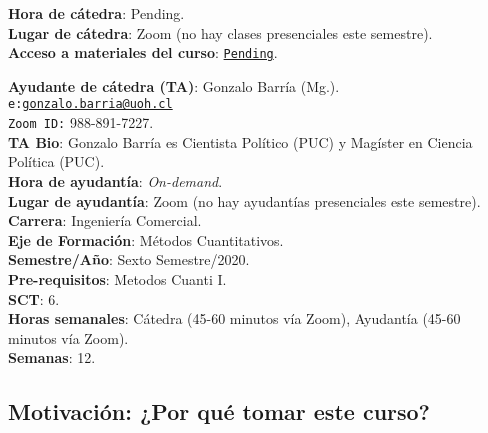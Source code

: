 \documentclass[letterpaper]{article}
\begin{document}
\vspace{5mm}
{\bf Hora de c\'atedra}: {\color{red}Pending.}\\
{\bf Lugar de c\'atedra}: Zoom (no hay clases presenciales este semestre).\\

{\bf Acceso a materiales del curso}: \href{https://ucampus.uoh.cl/uoh/2020/1/ICE3201/1}{\texttt{{\color{red}Pending}}}.

\vspace{5mm}
{\bf Ayudante de c\'atedra (TA)}: Gonzalo Barr\'ia (Mg.).\\
\texttt{e:}\href{mailto:gonzalo.barria@uoh.cl}{\texttt{gonzalo.barria@uoh.cl}}\\
\texttt{Zoom ID:} 988-891-7227.\\
{\bf TA Bio}: Gonzalo Barr\'ia es Cientista Pol\'itico (PUC) y Mag\'ister en Ciencia Pol\'itica (PUC).\\
{\bf Hora de ayudant\'ia}: \emph{On-demand}.\\
{\bf Lugar de ayudant\'ia}: Zoom (no hay ayudant\'ias presenciales este semestre).\\


\vspace{5mm}
{\bf Carrera}:  Ingenier\'ia Comercial.\\
{\bf Eje de Formaci\'on}: M\'etodos Cuantitativos.\\
{\bf Semestre/A\~no}: Sexto Semestre/2020.\\
{\bf Pre-requisitos}: Metodos Cuanti I.\\
{\bf SCT}: 6.\\
{\bf Horas semanales}: C\'atedra (45-60 minutos v\'ia Zoom), Ayudant\'ia  (45-60 minutos v\'ia Zoom). \\
{\bf Semanas}:  12.



\subsection*{Motivaci\'on: ¿Por qu\'e tomar este curso?}
\end{document}
